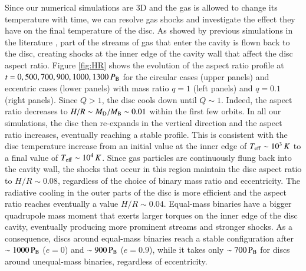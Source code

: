 \documentclass{aa}
\begin{document}
Since our numerical simulations are 3D and the gas is allowed to change its temperature with time, we can resolve gas shocks and investigate the effect they have on the final temperature of the disc.
As showed by previous simulations in the literature \citep{artymowicz1996, Hayasaki2007, Macfadyen2008,roedig2011, Shi2012, farris2014, Franchini2022, Westernacher2022, Westernacher2023}, part of the streams of gas that enter the cavity is flown back to the disc, creating shocks at the inner edge of the cavity wall that affect the disc aspect ratio. 
Figure \ref{fig:HR} shows the evolution of the aspect ratio profile at $t = 0, 500, 700, 900, 1000, 1300 \, P_{\rm B}$ for the circular cases (upper panels) and eccentric cases (lower panels) with mass ratio $q=1$ (left panels) and $q=0.1$ (right panels).
Since $Q > 1$, the disc cools down until $Q \sim 1$. Indeed, the aspect ratio decreases to $H/R \sim M_{\rm D }/M_{\rm B} \sim 0.01$ within the first few orbits.
In all our simulations, the disc then re-expands in the vertical direction and the aspect ratio increases, eventually reaching a stable profile. 
This is consistent with the disc temperature increase from an initial value at the inner edge of $T_{\rm eff}\sim 10^3 \, K$ to a final value of $T_{\rm eff}\sim 10^4 \, K$. 
Since gas particles are continuously flung back into the cavity wall, the shocks that occur in this region maintain the disc aspect ratio to $H/R\sim 0.08$, regardless of the choice of binary mass ratio and eccentricity. The radiative cooling in the outer parts of the disc is more efficient and the aspect ratio reaches eventually a value $H/R\sim 0.04$.
Equal-mass binaries have a bigger quadrupole mass moment that exerts larger torques on the inner edge of the disc cavity, eventually producing more prominent streams and stronger shocks. As a consequence, discs around equal-mass binaries reach a stable configuration after $\sim 1000 \, \rm{P_{B}}$ ($e=0$) and $\sim 900 \,\rm{P_{B}}$  ($e=0.9$), while it takes only  $\sim 700 \, \rm{P_{B}}$ for discs around unequal-mass binaries, regardless of eccentricity.
\end{document}
